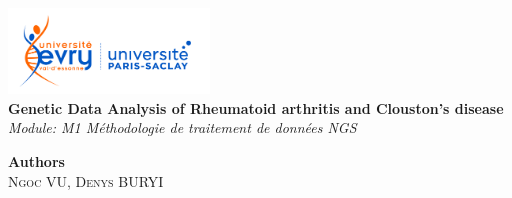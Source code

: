\documentclass[a4paper,12pt]{article}
\begin{document}
\begin{titlepage}
    \begin{center}
        \includegraphics[width=0.4\textwidth]{images/uni_logo.jpg} \\[1cm] %
        {\Large \textbf{Genetic Data Analysis of Rheumatoid arthritis and Clouston's disease}} \\[1cm] %
        \textit{Module: M1 Méthodologie de traitement de données NGS} \\[3cm] %

        \vfill %

        \textbf{Authors} \\[0.5cm]
        \textsc{Ngoc VU, Denys BURYI}


    \end{center}
\end{titlepage}
\end{document}
